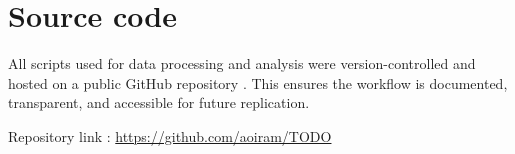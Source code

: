 \chapter{Source code}

All scripts used for data processing and analysis were version-controlled and hosted on a public GitHub repository \cite{GitHub}. This ensures the workflow is documented, transparent, and accessible for future replication.

Repository link : \href{https://github.com/aoiram/TODO}{https://github.com/aoiram/TODO}